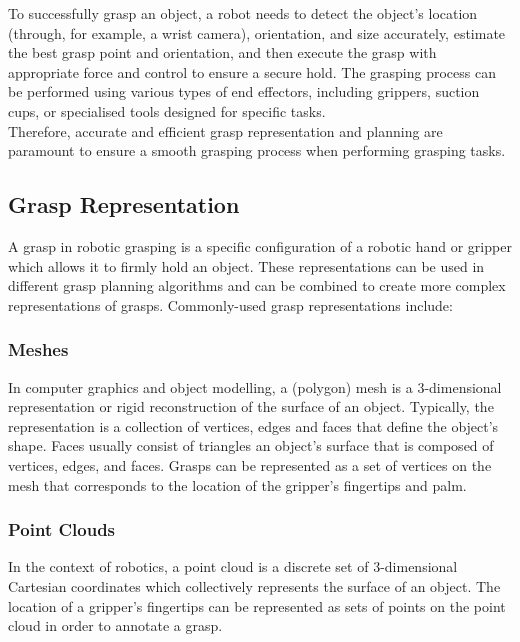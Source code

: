 \documentclass[11pt, a4paper]{report}
\begin{document}
To successfully grasp an object, a robot needs to detect the object's location (through, for example, a wrist camera), orientation, and size accurately, estimate the best grasp point and orientation, and then execute the grasp with appropriate force and control to ensure a secure hold. The grasping process can be performed using various types of end effectors, including grippers, suction cups, or specialised tools designed for specific tasks.\\

Therefore, accurate and efficient grasp representation and planning are paramount to ensure a smooth grasping process when performing grasping tasks.


\newpage
\subsection{Grasp Representation}
\label{sec:2.1.1}
A grasp in robotic grasping is a specific configuration of a robotic hand or gripper which allows it to firmly hold an object. These representations can be used in different grasp planning algorithms and can be combined to create more complex representations of grasps. Commonly-used grasp representations include: 


\subsubsection{Meshes}
\label{sec:2.1.1.1}
In computer graphics and object modelling, a (polygon) mesh is a 3-dimensional representation or rigid reconstruction of the surface of an object. Typically, the representation is a collection of vertices, edges and faces that define the object's shape. Faces usually consist of triangles an object's surface that is composed of vertices, edges, and faces. Grasps can be represented as a set of vertices on the mesh that corresponds to the location of the gripper's fingertips and palm.


\subsubsection{Point Clouds}
\label{sec:2.1.1.2}
In the context of robotics, a point cloud is a discrete set of 3-dimensional Cartesian coordinates which collectively represents the surface of an object. The location of a gripper's fingertips can be represented as sets of points on the point cloud in order to annotate a grasp.\\
\end{document}
